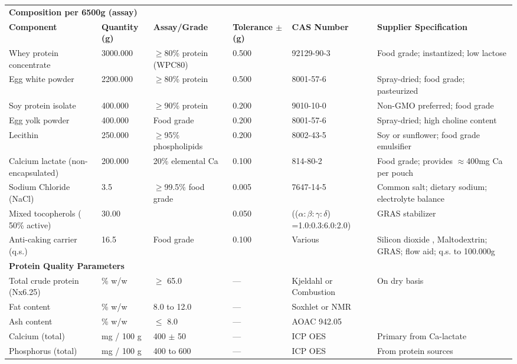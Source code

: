 \begin{longtable}{@{}p{6.0cm}p{1.5cm}p{1.8cm}p{2.0cm}p{3.0cm}p{3.0cm}@{}}
\multicolumn{6}{l}{\textbf{Composition per 6500g (assay)}} \\[3pt]
\textbf{Component} & \textbf{Quantity (g)} & \textbf{Assay/Grade} & \textbf{Tolerance $\pm$ (g)} & \textbf{CAS Number} & \textbf{Supplier Specification} \\
\midrule
Whey protein concentrate & 3000.000 & $\ge$80\% protein (WPC80) & 0.500 & 92129-90-3 & Food grade; instantized; low lactose \\[3pt]
Egg white powder & 2200.000 & $\ge$80\% protein & 0.500 & 8001-57-6 & Spray-dried; food grade; pasteurized \\[3pt]
Soy protein isolate & 400.000 & $\ge$90\% protein & 0.200 & 9010-10-0 & Non-GMO preferred; food grade \\[3pt]
Egg yolk powder & 400.000 & Food grade & 0.200 & 8001-57-6 & Spray-dried; high choline content \\[3pt]
Lecithin & 250.000 & $\ge$95\% phospholipids & 0.200 & 8002-43-5 & Soy or sunflower; food grade emulsifier \\[3pt]
Calcium lactate (non-encapsulated) & 200.000 & 20\% elemental Ca & 0.100 & 814-80-2 & Food grade; provides $\approx$400mg Ca per pouch \\[3pt]
Sodium Chloride (NaCl) & 3.5 & $\ge$99.5\% food grade & 0.005 & 7647-14-5 & Common salt; dietary sodium; electrolyte balance \\[3pt]
\midrule
\midrule
Mixed tocopherols ( 50\% active) & 30.00 &  & 0.050 & (($\alpha:\beta:\gamma:\delta$) =1.0:0.3:6.0:2.0) &  GRAS stabilizer \\[3pt]
Anti-caking carrier (q.s.) & 16.5 & Food grade & 0.100 & Various & Silicon dioxide , Maltodextrin; GRAS; flow aid; q.s. to 100.000g \\[3pt]

\multicolumn{6}{l}{\textbf{Protein Quality Parameters}} \\[3pt]
Total crude protein (Nx6.25) & \% w/w & $\ge$ 65.0 & --- & Kjeldahl or Combustion & On dry basis \\[3pt]
Fat content & \% w/w & 8.0 to 12.0 & --- & Soxhlet or NMR & \\[3pt]
Ash content & \% w/w & $\le$ 8.0 & --- & AOAC 942.05 & \\[3pt]
Calcium (total) & mg / 100 g & 400 $\pm$ 50 & --- & ICP OES & Primary from Ca-lactate \\[3pt]
Phosphorus (total) & mg / 100 g & 400 to 600 & --- & ICP OES & From protein sources \\[6pt]


\end{longtable}

